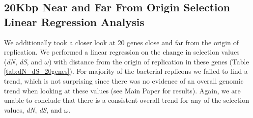 \documentclass[11pt]{article}
\newcommand{\dn}{\textit{dN}\xspace}
\newcommand{\ds}{\textit{dS}\xspace}
\begin{document}
\subsection{20Kbp Near and Far From Origin Selection Linear Regression Analysis}
\label{20Kbp_near_far}
We additionally took a closer look at 20 genes close and far from the origin of replication.
We performed a linear regression on the change in selection values (\dn, \ds, and $\omega$) with distance from the origin of replication in these genes (Table \ref{tab:dN_dS_20genes}).
For majority of the bacterial replicons we failed to find a trend, which is not surprising since there was no evidence of an overall genomic trend when looking at these values (see Main Paper for results).
Again, we are unable to conclude that there is a consistent overall trend for any of the selection values, \dn, \ds, and $\omega$.
\end{document}
